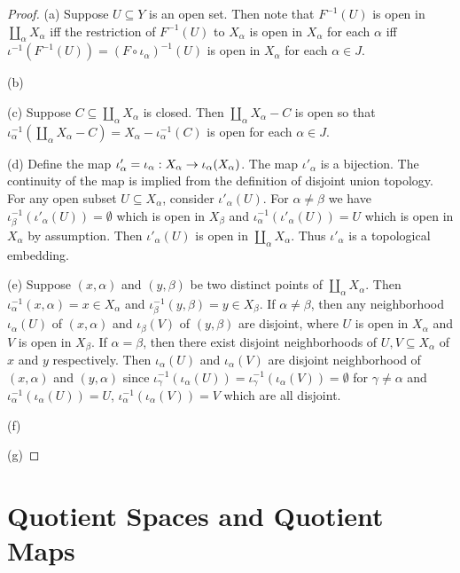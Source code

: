 \documentclass[11pt,a4paper]{article}
\begin{document}
\begin{proof}
(a) Suppose $U\subseteq Y$ is an open set. Then note that $F^{-1}(U)$ is open in $\coprod_{\alpha}X_\alpha$ iff the restriction of $F^{-1}(U)$ to $X_\alpha$ is open in $X_\alpha$ for each $\alpha$ iff $\iota^{-1}(F^{-1}(U)) = (F\circ \iota_\alpha)^{-1}(U)$ is open in $X_\alpha$ for each $\alpha\in J$.

\noindent(b)

\noindent(c) Suppose $C\subseteq \coprod_{\alpha}X_\alpha$ is closed. Then $\coprod_{\alpha}X_\alpha-C$ is open so that $\iota_\alpha^{-1}(\coprod_{\alpha}X_\alpha-C) = X_\alpha - \iota_\alpha^{-1}(C)$ is open for each $\alpha\in J$.

\noindent(d) Define the map $\iota'_\alpha=\iota_\alpha:X_\alpha\rightarrow \iota_\alpha(X_\alpha)$. The map $\iota'_\alpha$ is a bijection. The continuity of the map is implied from the definition of disjoint union topology. For any open subset $U\subseteq X_\alpha$, consider $\iota'_\alpha(U)$. For $\alpha\neq \beta$ we have $\iota_\beta^{-1}(\iota'_\alpha(U)) = \emptyset$ which is open in $X_\beta$ and $\iota_\alpha^{-1}(\iota'_\alpha(U)) = U$ which is open in $X_\alpha$ by assumption. Then $\iota'_\alpha(U)$ is open in $\coprod_\alpha X_\alpha$. Thus $\iota'_\alpha$ is a topological embedding.

\noindent(e) Suppose $(x,\alpha)$ and $(y,\beta)$ be two distinct points of $\coprod_\alpha X_\alpha$. Then $\iota_\alpha^{-1}(x,\alpha) = x\in X_\alpha$ and $\iota_\beta^{-1}(y,\beta) = y\in X_\beta$. If $\alpha\neq\beta$, then any neighborhood $\iota_\alpha(U)$ of $(x,\alpha)$ and $\iota_\beta(V)$ of $(y,\beta)$ are disjoint, where $U$ is open in $X_\alpha$ and $V$ is open in $X_\beta$. If $\alpha=\beta$, then there exist disjoint neighborhoods of $U,V\subseteq X_\alpha$ of $x$ and $y$ respectively. Then $\iota_\alpha(U)$ and $\iota_\alpha(V)$ are disjoint neighborhood of $(x,\alpha)$ and $(y,\alpha)$ since $\iota_\gamma^{-1}(\iota_\alpha(U)) = \iota_\gamma^{-1}(\iota_\alpha(V)) = \emptyset$ for $\gamma\neq \alpha$ and $\iota_\alpha^{-1}(\iota_\alpha(U)) = U$, $\iota_\alpha^{-1}(\iota_\alpha(V)) = V$ which are all disjoint.

\noindent(f)

\noindent(g)
\end{proof}

\section{Quotient Spaces and Quotient Maps}
\end{document}
